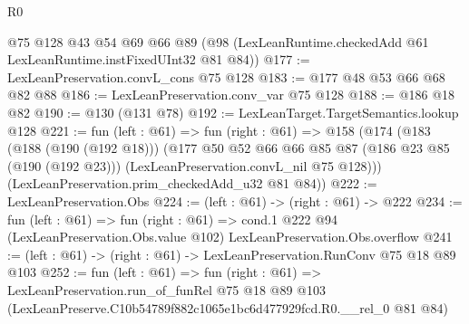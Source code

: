 \begin{lexlean}{R0}
\begin{coremodule}
    @75
    @128
    @43
    @54
    @69
    @66
    @89
    (@98 (LexLeanRuntime.checkedAdd @61 LexLeanRuntime.instFixedUInt32 @81 @84))
@177 := LexLeanPreservation.convL_cons @75 @128
@183 := @177 @48 @53 @66 @68 @82 @88
@186 := LexLeanPreservation.conv_var @75 @128
@188 := @186 @18 @82
@190 := @130 (@131 @78)
@192 := LexLeanTarget.TargetSemantics.lookup @128
@221 := fun (left : @61) =>
  fun (right : @61) =>
  @158
    (@174
      (@183
        (@188 (@190 (@192 @18)))
        (@177
          @50
          @52
          @66
          @66
          @85
          @87
          (@186 @23 @85 (@190 (@192 @23)))
          (LexLeanPreservation.convL_nil @75 @128)))
      (LexLeanPreservation.prim_checkedAdd_u32 @81 @84))
@222 := LexLeanPreservation.Obs
@224 := (left : @61) -> (right : @61) -> @222
@234 := fun (left : @61) =>
  fun (right : @61) =>
  cond.{1} @222 @94 (LexLeanPreservation.Obs.value @102) LexLeanPreservation.Obs.overflow
@241 := (left : @61) -> (right : @61) -> LexLeanPreservation.RunConv @75 @18 @89 @103
@252 := fun (left : @61) =>
  fun (right : @61) =>
  LexLeanPreservation.run_of_funRel
    @75
    @18
    @89
    @103
    (LexLeanPreserve.C10b54789f882c1065e1bc6d477929fcd.R0.__rel_0 @81 @84)
\end{coremodule}
\end{lexlean}

